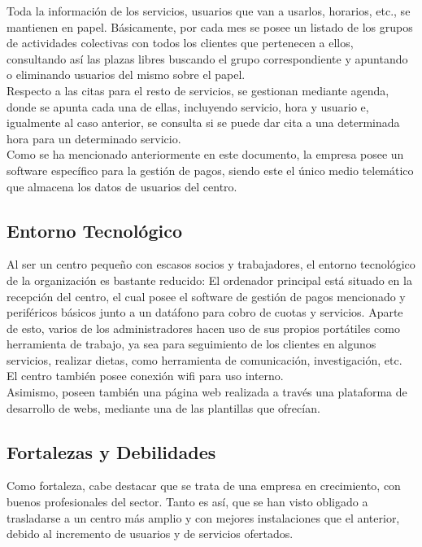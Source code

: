 Toda la información de los servicios, usuarios que van a usarlos, horarios, etc., se mantienen en papel. Básicamente, por cada mes se posee un listado de los grupos de actividades colectivas con todos los clientes que pertenecen a ellos, consultando así las plazas libres buscando el grupo correspondiente y apuntando o eliminando usuarios del mismo sobre el papel. \\
Respecto a las citas para el resto de servicios, se gestionan mediante agenda, donde se apunta cada una de ellas, incluyendo servicio, hora y usuario e, igualmente al caso anterior, se consulta si se puede dar cita a una determinada hora para un determinado servicio. 
\\

Como se ha mencionado anteriormente en este documento, la empresa posee un software específico para la gestión de pagos, siendo este el único medio telemático que almacena los datos de usuarios del centro.


\subsection{Entorno Tecnológico}

Al ser un centro pequeño con escasos socios y trabajadores, el entorno tecnológico de la organización es bastante reducido: El ordenador principal está situado en la recepción del centro, el cual posee el software de gestión de pagos mencionado y periféricos básicos junto a un datáfono para cobro de cuotas y servicios. Aparte de esto, varios de los administradores hacen uso de sus propios portátiles como herramienta de trabajo, ya sea para seguimiento de los clientes en algunos servicios, realizar dietas, como herramienta de comunicación, investigación, etc. 
\\

El centro también posee conexión wifi para uso interno.
\\

Asimismo, poseen también una página web realizada a través una plataforma de desarrollo de webs, mediante una de las plantillas que ofrecían.


\subsection{Fortalezas y Debilidades}

Como fortaleza, cabe destacar que se trata de una empresa en crecimiento, con buenos profesionales del sector. Tanto es así, que se han visto obligado a trasladarse a un centro más amplio y con mejores instalaciones que el anterior, debido al incremento de usuarios y de servicios ofertados.
\\

